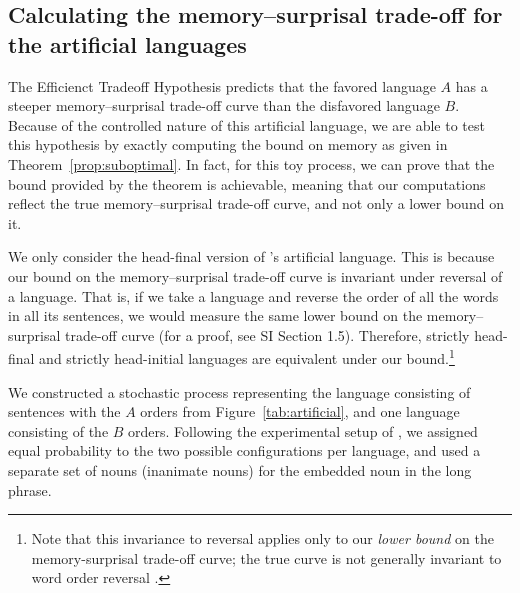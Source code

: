 \subsection{Calculating the memory--surprisal trade-off for the artificial languages}

The Efficienct Tradeoff Hypothesis predicts that the favored language $A$ has a steeper memory--surprisal trade-off curve than the disfavored language $B$. Because of the controlled nature of this artificial language, we are able to test this hypothesis by exactly computing the bound on memory as given in Theorem~\ref{prop:suboptimal}. In fact, for this toy process, we can prove that the bound provided by the theorem is achievable, meaning that our computations reflect the true memory--surprisal trade-off curve, and not only a lower bound on it.

We only consider the head-final version of \citet{fedzechkina-human-2017}'s artificial language. This is because our bound on the memory--surprisal trade-off curve is invariant under reversal of a language. That is, if we take a language and reverse the order of all the words in all its sentences, we would measure the same lower bound on the memory--surprisal trade-off curve (for a proof, see SI Section 1.5). Therefore, strictly head-final and strictly head-initial languages are equivalent under our bound.\footnote{Note that this invariance to reversal applies only to our \emph{lower bound} on the memory-surprisal trade-off curve; the true curve is not generally invariant to word order reversal \citep{crutchfield-times-2009}.} 


We constructed a stochastic process representing the language consisting of sentences with the $A$ orders from Figure~\ref{tab:artificial}, and one language consisting of the $B$ orders. Following the experimental setup of \cite{fedzechkina-human-2017}, we assigned equal probability to the two possible configurations per language, and used a separate set of nouns (inanimate nouns) for the embedded noun in the long phrase.

